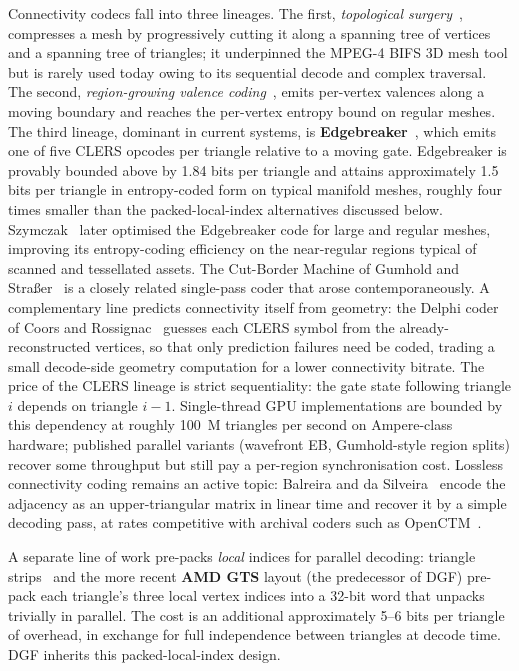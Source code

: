 \documentclass[pdflatex,sn-vancouver-num]{sn-jnl}%
\theoremstyle{thmstyleone}%
\theoremstyle{thmstyletwo}%
\theoremstyle{thmstylethree}%
\begin{document}
Connectivity codecs fall into three lineages. The first, \emph{topological surgery}~\cite{ref16_taubin_rossignac_1998}, compresses a mesh by progressively cutting it along a spanning tree of vertices and a spanning tree of triangles; it underpinned the MPEG-4 BIFS 3D mesh tool but is rarely used today owing to its sequential decode and complex traversal. The second, \emph{region-growing valence coding}~\cite{ref17_alliez_desbrun_2001,ref18_khodakovsky_2002}, emits per-vertex valences along a moving boundary and reaches the per-vertex entropy bound on regular meshes. The third lineage, dominant in current systems, is \textbf{Edgebreaker}~\cite{ref04_edgebreaker_1999}, which emits one of five CLERS opcodes per triangle relative to a moving gate. Edgebreaker is provably bounded above by 1.84 bits per triangle and attains approximately 1.5 bits per triangle in entropy-coded form on typical manifold meshes, roughly four times smaller than the packed-local-index alternatives discussed below. Szymczak~\cite{ref35_szymczak_2003} later optimised the Edgebreaker code for large and regular meshes, improving its entropy-coding efficiency on the near-regular regions typical of scanned and tessellated assets. The Cut-Border Machine of Gumhold and Stra{\ss}er~\cite{ref19_gumhold_strasser_1998} is a closely related single-pass coder that arose contemporaneously. A complementary line predicts connectivity itself from geometry: the Delphi coder of Coors and Rossignac~\cite{ref36_coors_delphi_2004} guesses each CLERS symbol from the already-reconstructed vertices, so that only prediction failures need be coded, trading a small decode-side geometry computation for a lower connectivity bitrate. The price of the CLERS lineage is strict sequentiality: the gate state following triangle $i$ depends on triangle $i-1$. Single-thread GPU implementations are bounded by this dependency at roughly 100~M triangles per second on Ampere-class hardware; published parallel variants (wavefront EB, Gumhold-style region splits) recover some throughput but still pay a per-region synchronisation cost. Lossless connectivity coding remains an active topic: Balreira and da Silveira~\cite{ref37_balreira_2024} encode the adjacency as an upper-triangular matrix in linear time and recover it by a simple decoding pass, at rates competitive with archival coders such as OpenCTM~\cite{ref29_openctm}.

A separate line of work pre-packs \emph{local} indices for parallel decoding: triangle strips~\cite{ref20_deering_1995} and the more recent \textbf{AMD GTS} layout (the predecessor of DGF) pre-pack each triangle's three local vertex indices into a 32-bit word that unpacks trivially in parallel. The cost is an additional approximately 5--6 bits per triangle of overhead, in exchange for full independence between triangles at decode time. DGF inherits this packed-local-index design.
\end{document}
